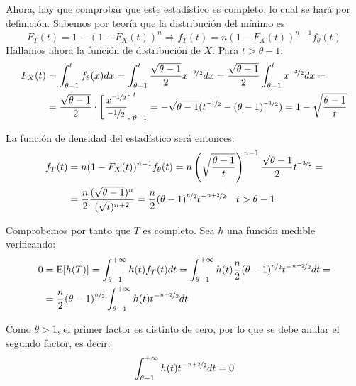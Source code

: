 \documentclass[12pt]{article}
\newcommand{\E}{\mathrm{E}}
\begin{document}
\begin{ejercicio}[2.5 puntos]
\begin{enumerate}[label=\alph*)]
            \newpage

            Ahora, hay que comprobar que este estadístico es completo, lo cual se hará por definición. Sabemos por teoría que la distribución del mínimo es 
            $$F_T(t) = 1 - (1 - F_X(t))^n \Longrightarrow f_T(t) = n(1 - F_X(t))^{n-1} f_\theta(t)$$
            Hallamos ahora la función de distribución de $X$. Para $t > \theta-1$:
            \begin{align*}
                F_X(t) &= \int_{\theta - 1}^{t} f_\theta(x) dx = \int_{\theta - 1}^{t} \frac{\sqrt{\theta-1}}{2}x^{\nicefrac{-3}{2}} dx = 
                \frac{\sqrt{\theta-1}}{2} \int_{\theta - 1}^{t} x^{\nicefrac{-3}{2}} dx
                =\\&= \frac{\sqrt{\theta-1}}{2} \cdot \left[ \dfrac{x^{\nicefrac{-1}{2}}}{\nicefrac{-1}{2}} \right]_{\theta - 1}^{t}
                =-\sqrt{\theta-1} (t^{\nicefrac{-1}{2}} - (\theta-1)^{\nicefrac{-1}{2}}) = 1 - \sqrt{\dfrac{\theta-1}{t}}
            \end{align*}

            La función de densidad del estadístico será entonces:
            \begin{align*}
                f_T(t) &= n(1 - F_X(t))^{n-1} f_\theta(t) = n \left(\sqrt{\dfrac{\theta-1}{t}}\right)^{n-1} \frac{\sqrt{\theta-1}}{2}t^{\nicefrac{-3}{2}}
                =\\&= \dfrac{n}{2} \dfrac{(\sqrt{\theta-1})^{n}}{(\sqrt{t})^{n+2}} = \dfrac{n}{2} (\theta-1)^{\nicefrac{n}{2}} t^{-\nicefrac{n+2}{2}} \quad t > \theta-1
            \end{align*}
            
            Comprobemos por tanto que $T$ es completo. Sea $h$ una función medible verificando:
            \begin{align*}
                0 &= \E[h(T)] = \int_{\theta-1}^{+\infty} h(t) f_T(t) dt = \int_{\theta-1}^{+\infty} h(t) \dfrac{n}{2} (\theta-1)^{\nicefrac{n}{2}} t^{-\nicefrac{n+2}{2}} dt
                =\\&= \dfrac{n}{2} (\theta-1)^{\nicefrac{n}{2}} \int_{\theta-1}^{+\infty} h(t) t^{-\nicefrac{n+2}{2}} dt
            \end{align*}

            Como $\theta>1$, el primer factor es distinto de cero, por lo que se debe anular el segundo factor, es decir:
            \begin{equation*}
                \int_{\theta-1}^{+\infty} h(t) t^{-\nicefrac{n+2}{2}} dt = 0
            \end{equation*}
            

\end{enumerate}
\end{ejercicio}
\end{document}
